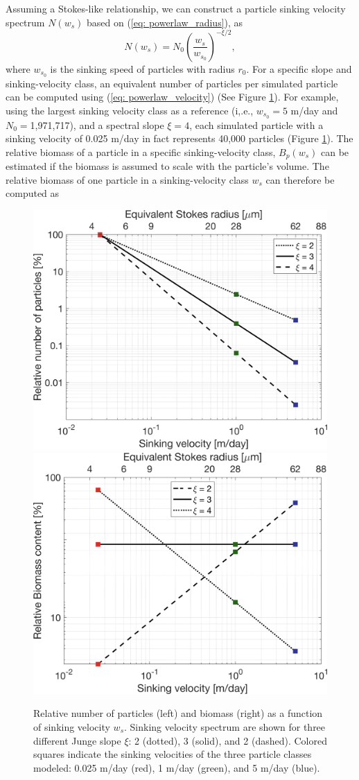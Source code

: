 \documentclass[article,linenumbers]{agujournal2018}
\begin{document}
	Assuming a Stokes-like relationship, we can construct a particle sinking velocity spectrum $N(w_s)$ based on (\ref{eq: powerlaw_radius}), as
	\begin{equation}
		N(w_s) = N_0 \left(\frac{w_s}{w_{s_0}}\right)^{-\xi/2},
		\label{eq: powerlaw_velocity}
	\end{equation}
	where $w_{s_0}$ is the sinking speed of particles with radius $r_0$.
	For a specific slope and sinking-velocity class, an equivalent number of particles per simulated particle can be computed using (\ref{eq: powerlaw_velocity}) (See Figure \ref{fig: sinking_velocity_spectrum}). For example, using the largest sinking velocity class as a reference (i,.e., $w_{s_0} = 5$ m/day and $N_0=$1,971,717), and a spectral slope $\xi = 4$, each simulated particle with a sinking velocity of 0.025 m/day in fact represents 40,000 particles (Figure \ref{fig: sinking_velocity_spectrum}). The relative biomass of a particle in a specific sinking-velocity class, $B_p(w_s)$ can be estimated if the biomass is assumed to scale with the particle's volume. The relative biomass of one particle in a sinking-velocity class $w_s$ can therefore be computed as
	\begin{figure}[ht]
		\centering
		\includegraphics[width = .49\linewidth]{Fig4b.png}
		\includegraphics[width = .49\linewidth]{Fig4a.png}
		\caption{Relative number of particles (left) and biomass (right) as a function of sinking velocity $w_s$. Sinking velocity spectrum are shown for three different Junge slope $\xi$: 2 (dotted), 3 (solid), and 2 (dashed). Colored squares indicate the sinking velocities of the three particle classes modeled: 0.025 m/day (red), 1 m/day (green), and 5 m/day (blue).}
		\label{fig: sinking_velocity_spectrum}
	\end{figure}
\end{document}
